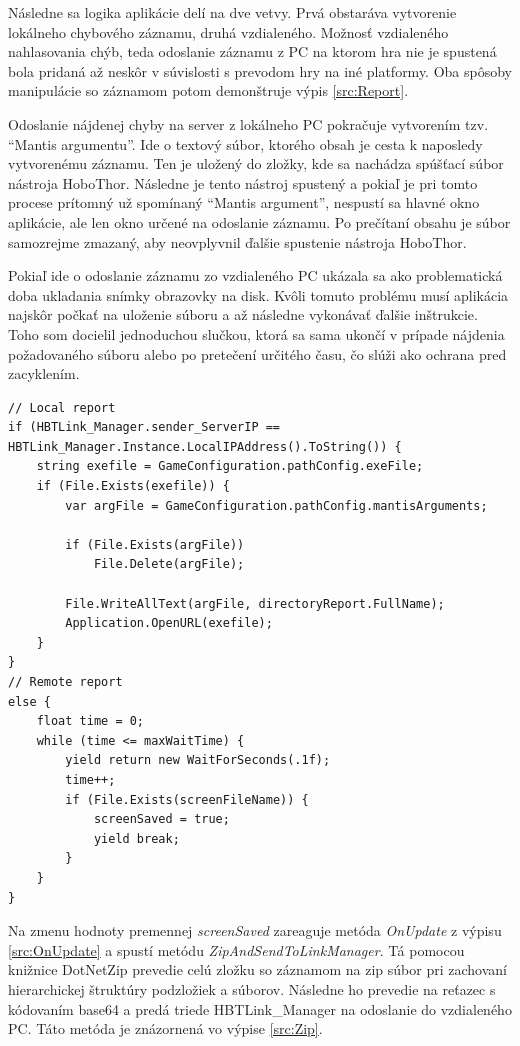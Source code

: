 \documentclass[slovak, bachelorpractice]{diploma}
\begin{document}
Následne sa logika aplikácie delí na dve vetvy. Prvá obstaráva vytvorenie lokálneho chybového záznamu, druhá vzdialeného. Možnosť vzdialeného nahlasovania chýb, teda odoslanie záznamu z PC na ktorom hra nie je spustená bola pridaná až neskôr v súvislosti s prevodom hry na iné platformy. Oba spôsoby manipulácie so záznamom potom demonštruje výpis \ref{src:Report}.

Odoslanie nájdenej chyby na server z lokálneho PC pokračuje vytvorením tzv. \enquote{Mantis argumentu}. Ide o textový súbor, ktorého obsah je cesta k naposledy vytvorenému záznamu. Ten je uložený do zložky, kde sa nachádza spúšťací súbor nástroja HoboThor. Následne je tento nástroj spustený a pokiaľ je pri tomto procese prítomný už spomínaný \enquote{Mantis argument}, nespustí sa hlavné okno aplikácie, ale len okno určené na odoslanie záznamu. Po prečítaní obsahu je súbor samozrejme zmazaný, aby neovplyvnil ďalšie spustenie nástroja HoboThor.

Pokiaľ ide o odoslanie záznamu zo vzdialeného PC ukázala sa ako problematická doba ukladania snímky obrazovky na disk. Kvôli tomuto problému musí aplikácia najskôr počkať na uloženie súboru a až následne vykonávať ďalšie inštrukcie. Toho som docielil jednoduchou slučkou, ktorá sa sama ukončí v prípade nájdenia požadovaného súboru alebo po pretečení určitého času, čo slúži ako ochrana pred zacyklením. 

\vspace{15pt}
\begin{lstlisting}[label=src:Report,caption={Vytváranie lokálneho a vzdialeného záznamu o chybe}]
// Local report
if (HBTLink_Manager.sender_ServerIP == HBTLink_Manager.Instance.LocalIPAddress().ToString()) {
    string exefile = GameConfiguration.pathConfig.exeFile;
    if (File.Exists(exefile)) {
        var argFile = GameConfiguration.pathConfig.mantisArguments;

        if (File.Exists(argFile))
            File.Delete(argFile);

        File.WriteAllText(argFile, directoryReport.FullName);
        Application.OpenURL(exefile);
    }
}
// Remote report
else {
    float time = 0;
    while (time <= maxWaitTime) {
        yield return new WaitForSeconds(.1f);
        time++;
        if (File.Exists(screenFileName)) {
            screenSaved = true;
            yield break;
        }
    }
}
\end{lstlisting}

Na zmenu hodnoty premennej \textit{screenSaved} zareaguje metóda \textit{OnUpdate} z výpisu \ref{src:OnUpdate} a spustí metódu \textit{ZipAndSendToLinkManager}. Tá pomocou knižnice DotNetZip \cite{DotNetZip} prevedie celú zložku so záznamom na zip súbor pri zachovaní hierarchickej štruktúry podzložiek a súborov. Následne ho prevedie na reťazec s kódovaním base64 a predá triede HBTLink\_Manager na odoslanie do vzdialeného PC. Táto metóda je znázornená vo výpise \ref{src:Zip}. 
\end{document}
